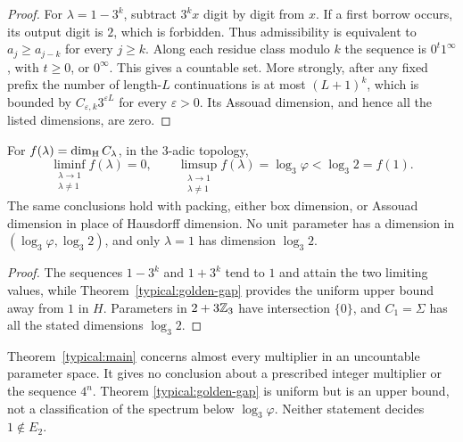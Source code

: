 \begin{proof}
For $\lambda=1-3^k$, subtract $3^kx$ digit by digit from $x$.
If a first borrow occurs, its output digit is $2$, which is
forbidden. Thus admissibility is equivalent to
$a_j\ge a_{j-k}$ for every $j\ge k$. Along each residue class
modulo $k$ the sequence is $0^t1^\infty$, with $t\ge0$, or
$0^\infty$. This gives a countable set. More strongly, after any
fixed prefix the number of length-$L$ continuations is at most
$(L+1)^k$, which is bounded by $C_{\varepsilon,k}3^{\varepsilon L}$
for every $\varepsilon>0$. Its Assouad dimension, and hence all
the listed dimensions, are zero.
\end{proof}

\begin{corollary}
\label{typical:oscillation}
For $f(\lambda)=\dim_{\mathrm H} C_\lambda$, in the $3$-adic topology,
\[
 \liminf_{\substack{\lambda\to1\\\lambda\ne1}}f(\lambda)=0,
 \qquad
 \limsup_{\substack{\lambda\to1\\\lambda\ne1}}f(\lambda)
      =\log_3\varphi<\log_3 2=f(1).
\]
The same conclusions hold with packing, either box dimension,
or Assouad dimension in place of Hausdorff dimension. No unit
parameter has a dimension in $(\log_3\varphi,\log_3 2)$, and
only $\lambda=1$ has dimension $\log_3 2$.
\end{corollary}

\begin{proof}
The sequences $1-3^k$ and $1+3^k$ tend to $1$ and attain the
two limiting values, while Theorem~\ref{typical:golden-gap}
provides the uniform upper bound away from $1$ in $H$.
Parameters in $2+3\mathbb Z_3$ have intersection $\{0\}$, and
$C_1=\Sigma$ has all the stated dimensions $\log_3 2$.
\end{proof}

\begin{remark}\label{typical:scope}
Theorem~\ref{typical:main} concerns almost every multiplier in an
uncountable parameter space. It gives no conclusion about a
prescribed integer multiplier or the sequence $4^n$. Theorem
\ref{typical:golden-gap} is uniform but is an upper bound, not a
classification of the spectrum below $\log_3\varphi$.
Neither statement decides $1\notin E_2$.
\end{remark}
